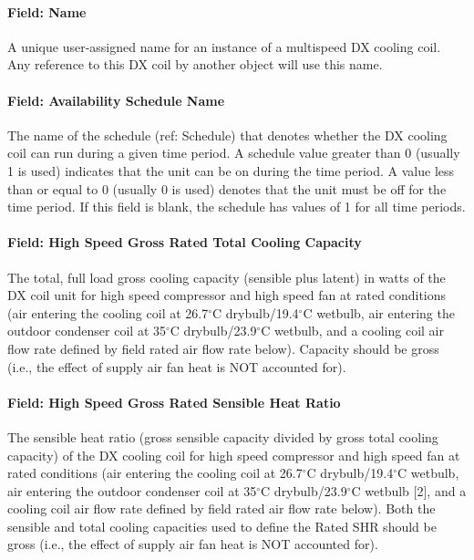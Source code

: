 \paragraph{Field: Name}\label{field-name-13-003}

A unique user-assigned name for an instance of a multispeed DX cooling coil. Any reference to this DX coil by another object will use this name.

\paragraph{Field: Availability Schedule Name}\label{field-availability-schedule-name-7-001}

The name of the schedule (ref: Schedule) that denotes whether the DX cooling coil can run during a given time period. A schedule value greater than 0 (usually 1 is used) indicates that the unit can be on during the time period. A value less than or equal to 0 (usually 0 is used) denotes that the unit must be off for the time period. If this field is blank, the schedule has values of 1 for all time periods.

\paragraph{Field: High Speed Gross Rated Total Cooling Capacity}\label{field-high-speed-gross-rated-total-cooling-capacity}

The total, full load gross cooling capacity (sensible plus latent) in watts of the DX coil unit for high speed compressor and high speed fan at rated conditions (air entering the cooling coil at 26.7$^\circ$C drybulb/19.4$^\circ$C wetbulb, air entering the outdoor condenser coil at 35$^\circ$C drybulb/23.9$^\circ$C wetbulb, and a cooling coil air flow rate defined by field rated air flow rate below). Capacity should be gross (i.e., the effect of supply air fan heat is NOT accounted for).

\paragraph{Field: High Speed Gross Rated Sensible Heat Ratio}\label{field-high-speed-gross-rated-sensible-heat-ratio}

The sensible heat ratio (gross sensible capacity divided by gross total cooling capacity) of the DX cooling coil for high speed compressor and high speed fan at rated conditions (air entering the cooling coil at 26.7$^\circ$C drybulb/19.4$^\circ$C wetbulb, air entering the outdoor condenser coil at 35$^\circ$C drybulb/23.9$^\circ$C wetbulb {[}2{]}, and a cooling coil air flow rate defined by field rated air flow rate below). Both the sensible and total cooling capacities used to define the Rated SHR should be gross (i.e., the effect of supply air fan heat is NOT accounted for).

